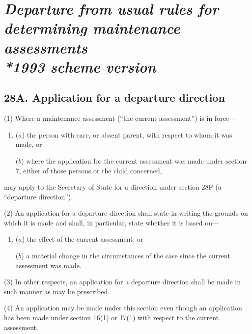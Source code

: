\documentclass[12pt,a4paper]{article}
\begin{document}
\section[\itshape Departure from usual rules for determining maintenance assessments --- \emph{1993 scheme version}]{\itshape Departure from usual rules for determining maintenance assessments\\*\emph{1993 scheme version}}

\subsection{28A. Application for a departure direction}

(1) Where a maintenance assessment (“the current assessment”) is in force—
\begin{enumerate}\item[]
($a$) the person with care, or absent parent, with respect to whom it was made, or

($b$) where the application for the current assessment was made under section 7, either of those persons or the child concerned,
\end{enumerate}
may apply to the Secretary of State for a direction under section 28F (a “departure direction”).

(2) An application for a departure direction shall state in writing the grounds on which it is made and shall, in particular, state whether it is based on—
\begin{enumerate}\item[]
($a$) the effect of the current assessment; or

($b$) a material change in the circumstances of the case since the current assessment was made.
\end{enumerate}

(3) In other respects, an application for a departure direction shall be made in such manner as may be prescribed.

%

(4) An application may be made under this section even though an application has been made under section 16(1) or 17(1) with respect to the current assessment.
\end{document}
